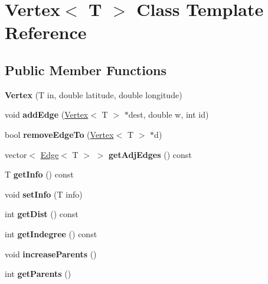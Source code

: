 \hypertarget{class_vertex}{}\section{Vertex$<$ T $>$ Class Template Reference}
\label{class_vertex}
\subsection*{Public Member Functions}
\begin{DoxyCompactItemize}
\item 
{\bfseries Vertex} (T in, double latitude, double longitude)\hypertarget{class_vertex_aa043cef38a1f400ae820f1b037c014a0}{}\label{class_vertex_aa043cef38a1f400ae820f1b037c014a0}

\item 
void {\bfseries add\+Edge} (\hyperlink{class_vertex}{Vertex}$<$ T $>$ $\ast$dest, double w, int id)\hypertarget{class_vertex_a65f08826c528b0e42a889ecc053977ac}{}\label{class_vertex_a65f08826c528b0e42a889ecc053977ac}

\item 
bool {\bfseries remove\+Edge\+To} (\hyperlink{class_vertex}{Vertex}$<$ T $>$ $\ast$d)\hypertarget{class_vertex_ab2b5b43fb1709a901b78718436763a84}{}\label{class_vertex_ab2b5b43fb1709a901b78718436763a84}

\item 
vector$<$ \hyperlink{class_edge}{Edge}$<$ T $>$ $>$ {\bfseries get\+Adj\+Edges} () const \hypertarget{class_vertex_ad810fe80d7069ff90bf75e1bfa8e753f}{}\label{class_vertex_ad810fe80d7069ff90bf75e1bfa8e753f}

\item 
T {\bfseries get\+Info} () const \hypertarget{class_vertex_a5880b4b252ae6818819c2f9645784b59}{}\label{class_vertex_a5880b4b252ae6818819c2f9645784b59}

\item 
void {\bfseries set\+Info} (T info)\hypertarget{class_vertex_a31cd60c26640f8072a928ba70eb2f95e}{}\label{class_vertex_a31cd60c26640f8072a928ba70eb2f95e}

\item 
int {\bfseries get\+Dist} () const \hypertarget{class_vertex_a3379c6cbcf1eaacc098381e3557a0b52}{}\label{class_vertex_a3379c6cbcf1eaacc098381e3557a0b52}

\item 
int {\bfseries get\+Indegree} () const \hypertarget{class_vertex_a305ef01582f945f22134abb9294fe1f3}{}\label{class_vertex_a305ef01582f945f22134abb9294fe1f3}

\item 
void {\bfseries increase\+Parents} ()\hypertarget{class_vertex_a663e4012a75736f332ef10a19631c788}{}\label{class_vertex_a663e4012a75736f332ef10a19631c788}

\item 
int {\bfseries get\+Parents} ()\hypertarget{class_vertex_a1411168a8dd802c191e05d078c29523f}{}\label{class_vertex_a1411168a8dd802c191e05d078c29523f}

\end{DoxyCompactItemize}
